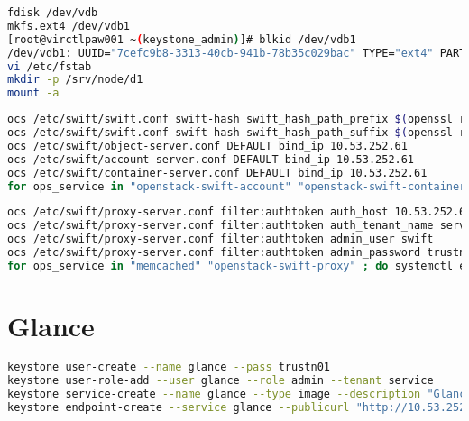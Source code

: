 \documentclass[11pt,letterpaper,oneside]{book}
\begin{document}
\begin{lstlisting}[caption={Install Swift},language=bash]
fdisk /dev/vdb
mkfs.ext4 /dev/vdb1 
[root@virctlpaw001 ~(keystone_admin)]# blkid /dev/vdb1 
/dev/vdb1: UUID="7cefc9b8-3313-40cb-941b-78b35c029bac" TYPE="ext4" PARTUUID="9faed234-01" 
vi /etc/fstab 
mkdir -p /srv/node/d1
mount -a
\end{lstlisting}

\begin{lstlisting}[caption={Swift account, container, object},language=bash]
ocs /etc/swift/swift.conf swift-hash swift_hash_path_prefix $(openssl rand -hex 10)
ocs /etc/swift/swift.conf swift-hash swift_hash_path_suffix $(openssl rand -hex 10)
ocs /etc/swift/object-server.conf DEFAULT bind_ip 10.53.252.61
ocs /etc/swift/account-server.conf DEFAULT bind_ip 10.53.252.61
ocs /etc/swift/container-server.conf DEFAULT bind_ip 10.53.252.61
for ops_service in "openstack-swift-account" "openstack-swift-container" "openstack-swift-object"; do systemctl enable $ops_service; systemctl start $ops_service; done
\end{lstlisting}


\begin{lstlisting}[caption={Swift Proxy},language=bash]
ocs /etc/swift/proxy-server.conf filter:authtoken auth_host 10.53.252.61
ocs /etc/swift/proxy-server.conf filter:authtoken auth_tenant_name service
ocs /etc/swift/proxy-server.conf filter:authtoken admin_user swift
ocs /etc/swift/proxy-server.conf filter:authtoken admin_password trustn01
for ops_service in "memcached" "openstack-swift-proxy" ; do systemctl enable $ops_service; systemctl start $ops_service; done
\end{lstlisting}


\chapter{Glance}

\begin{lstlisting}[caption={Glance Keystone create},language=bash]
keystone user-create --name glance --pass trustn01
keystone user-role-add --user glance --role admin --tenant service
keystone service-create --name glance --type image --description "Glance Image Service"
keystone endpoint-create --service glance --publicurl "http://10.53.252.61:9292" --adminurl "http://10.53.252.61:9292" --internalurl "http://10.53.252.61:9292"
\end{lstlisting}
\end{document}
